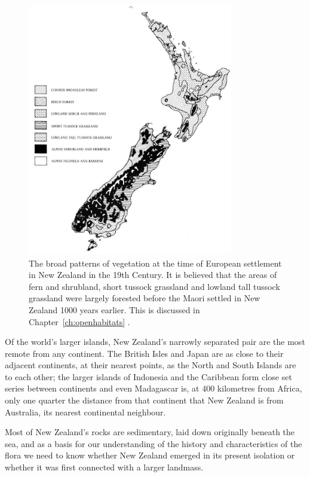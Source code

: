 \begin{figure}[!htb]
	\centering
	\includegraphics[width=0.8\textwidth]{graphics/figure1vegetation-patterns.jpg}
	\caption[Broad patterns of vegetation]{The broad patterns of vegetation at the time of European settlement in New Zealand in the 19th Century. 
	It is believed that the areas of fern and shrubland, short tussock grassland and lowland tall tussock grassland were largely forested before the Maori settled in New Zealand 1000 years earlier. 
	This is discussed in Chapter~\ref{ch:openhabitats} .}%
	\label{fig:1vegetationpatterns}
\end{figure}

Of the world's larger islands, New Zealand's narrowly separated pair are the most remote from any continent.
The British Isles and Japan are as close to their adjacent continents, at their nearest points, as the North and South Islands are to each other; the larger islands of Indonesia and the Caribbean form close set series between continents and even Madagascar is, at 400 kilometres from Africa, only one quarter the distance from that continent that New Zealand is from Australia, its nearest continental neighbour.

Most of New Zealand's rocks are sedimentary, laid down originally beneath the sea, and as a basis for our understanding of the history and characteristics of the flora we need to know whether New Zealand emerged in its present isolation or whether it was first connected with a larger landmass.

